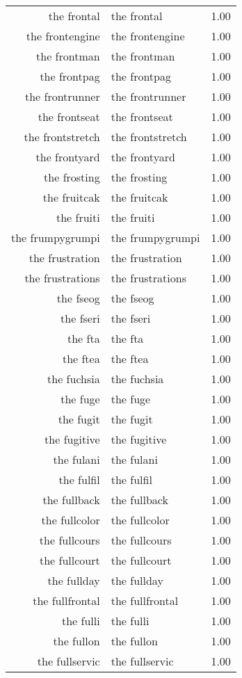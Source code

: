 \begin{table}[ht]
\begin{tabular}{rlr}
  the frontal & the frontal & 1.00 \\ 
  the frontengine & the frontengine & 1.00 \\ 
  the frontman & the frontman & 1.00 \\ 
  the frontpag & the frontpag & 1.00 \\ 
  the frontrunner & the frontrunner & 1.00 \\ 
  the frontseat & the frontseat & 1.00 \\ 
  the frontstretch & the frontstretch & 1.00 \\ 
  the frontyard & the frontyard & 1.00 \\ 
  the frosting & the frosting & 1.00 \\ 
  the fruitcak & the fruitcak & 1.00 \\ 
  the fruiti & the fruiti & 1.00 \\ 
  the frumpygrumpi & the frumpygrumpi & 1.00 \\ 
  the frustration & the frustration & 1.00 \\ 
  the frustrations & the frustrations & 1.00 \\ 
  the fseog & the fseog & 1.00 \\ 
  the fseri & the fseri & 1.00 \\ 
  the fta & the fta & 1.00 \\ 
  the ftea & the ftea & 1.00 \\ 
  the fuchsia & the fuchsia & 1.00 \\ 
  the fuge & the fuge & 1.00 \\ 
  the fugit & the fugit & 1.00 \\ 
  the fugitive & the fugitive & 1.00 \\ 
  the fulani & the fulani & 1.00 \\ 
  the fulfil & the fulfil & 1.00 \\ 
  the fullback & the fullback & 1.00 \\ 
  the fullcolor & the fullcolor & 1.00 \\ 
  the fullcours & the fullcours & 1.00 \\ 
  the fullcourt & the fullcourt & 1.00 \\ 
  the fullday & the fullday & 1.00 \\ 
  the fullfrontal & the fullfrontal & 1.00 \\ 
  the fulli & the fulli & 1.00 \\ 
  the fullon & the fullon & 1.00 \\ 
  the fullservic & the fullservic & 1.00 \\ 

\end{tabular}
\end{table}
